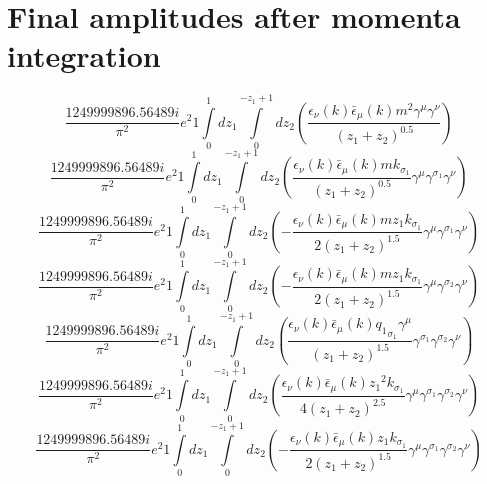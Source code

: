 \section*{Final amplitudes after momenta integration}
\begin{dmath}\frac{1249999896.56489 i}{\pi^{2}} e^{2}1\int\limits_{ 0 }^{ 1 } d{ z_{ 1 } }\int\limits_{ 0 }^{ - { z_{ 1 } } + 1 } d{ z_{ 2 } }\left(\frac{\epsilon_{ \nu }({ k }) \bar{\epsilon}_{ \mu }({ k }) m^{2} { \gamma^{ \mu } } { \gamma^{ \nu } }}{\left({ z_{ 1 } } + { z_{ 2 } }\right)^{0.5}}\right)\end{dmath}
\begin{dmath}\frac{1249999896.56489 i}{\pi^{2}} e^{2}1\int\limits_{ 0 }^{ 1 } d{ z_{ 1 } }\int\limits_{ 0 }^{ - { z_{ 1 } } + 1 } d{ z_{ 2 } }\left(\frac{\epsilon_{ \nu }({ k }) \bar{\epsilon}_{ \mu }({ k }) m { { k }_{ \sigma_1 } }}{\left({ z_{ 1 } } + { z_{ 2 } }\right)^{0.5}} { \gamma^{ \mu } } { \gamma^{ \sigma_1 } } { \gamma^{ \nu } }\right)\end{dmath}
\begin{dmath}\frac{1249999896.56489 i}{\pi^{2}} e^{2}1\int\limits_{ 0 }^{ 1 } d{ z_{ 1 } }\int\limits_{ 0 }^{ - { z_{ 1 } } + 1 } d{ z_{ 2 } }\left(- \frac{\epsilon_{ \nu }({ k }) \bar{\epsilon}_{ \mu }({ k }) m { z_{ 1 } } { { k }_{ \sigma_1 } }}{2 \left({ z_{ 1 } } + { z_{ 2 } }\right)^{1.5}} { \gamma^{ \mu } } { \gamma^{ \sigma_1 } } { \gamma^{ \nu } }\right)\end{dmath}
\begin{dmath}\frac{1249999896.56489 i}{\pi^{2}} e^{2}1\int\limits_{ 0 }^{ 1 } d{ z_{ 1 } }\int\limits_{ 0 }^{ - { z_{ 1 } } + 1 } d{ z_{ 2 } }\left(- \frac{\epsilon_{ \nu }({ k }) \bar{\epsilon}_{ \mu }({ k }) m { z_{ 1 } } { { k }_{ \sigma_1 } }}{2 \left({ z_{ 1 } } + { z_{ 2 } }\right)^{1.5}} { \gamma^{ \mu } } { \gamma^{ \sigma_2 } } { \gamma^{ \nu } }\right)\end{dmath}
\begin{dmath}\frac{1249999896.56489 i}{\pi^{2}} e^{2}1\int\limits_{ 0 }^{ 1 } d{ z_{ 1 } }\int\limits_{ 0 }^{ - { z_{ 1 } } + 1 } d{ z_{ 2 } }\left(\frac{\epsilon_{ \nu }({ k }) \bar{\epsilon}_{ \mu }({ k }) { { q_1 }_{ \sigma_1 } } { \gamma^{ \mu } }}{\left({ z_{ 1 } } + { z_{ 2 } }\right)^{1.5}} { \gamma^{ \sigma_1 } } { \gamma^{ \sigma_2 } } { \gamma^{ \nu } }\right)\end{dmath}
\begin{dmath}\frac{1249999896.56489 i}{\pi^{2}} e^{2}1\int\limits_{ 0 }^{ 1 } d{ z_{ 1 } }\int\limits_{ 0 }^{ - { z_{ 1 } } + 1 } d{ z_{ 2 } }\left(\frac{\epsilon_{ \nu }({ k }) \bar{\epsilon}_{ \mu }({ k }) { z_{ 1 } }^{2} { { k }_{ \sigma_1 } }}{4 \left({ z_{ 1 } } + { z_{ 2 } }\right)^{2.5}} { \gamma^{ \mu } } { \gamma^{ \sigma_1 } } { \gamma^{ \sigma_2 } } { \gamma^{ \nu } }\right)\end{dmath}
\begin{dmath}\frac{1249999896.56489 i}{\pi^{2}} e^{2}1\int\limits_{ 0 }^{ 1 } d{ z_{ 1 } }\int\limits_{ 0 }^{ - { z_{ 1 } } + 1 } d{ z_{ 2 } }\left(- \frac{\epsilon_{ \nu }({ k }) \bar{\epsilon}_{ \mu }({ k }) { z_{ 1 } } { { k }_{ \sigma_1 } }}{2 \left({ z_{ 1 } } + { z_{ 2 } }\right)^{1.5}} { \gamma^{ \mu } } { \gamma^{ \sigma_1 } } { \gamma^{ \sigma_2 } } { \gamma^{ \nu } }\right)\end{dmath}
